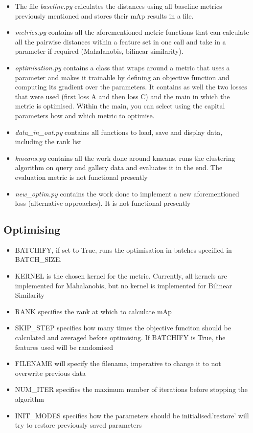 \documentclass[10pt,technote]{IEEEtran}
\begin{document}
\begin{itemize}
    \item The file \textit{baseline.py} calculates the distances using all baseline metrics previously mentioned and stores their mAp results in a file.
    \item \textit{metrics.py} contains all the aforementioned metric functions that can calculate all the pairwise distances within a feature set in one call and take in a parameter if required (Mahalanobis, bilinear similarity). 
    \item \textit{optimisation.py} contains a class that wraps around a metric that uses a parameter and makes it trainable by defining an objective function and computing its gradient over the parameters. It contains as well the two losses that were used (first loss A and then loss C) and the main in which the metric is optimised. Within the main, you can select using the capital parameters how and which metric to optimise.

    \item \textit{data\_in\_out.py} contains all functions to load, save and display data, including the rank list
    \item \textit{kmeans.py} contains all the work done around kmeans, runs the clustering algorithm on query and gallery data and evaluates it in the end. The evaluation metric is not functional presently
    \item \textit{new\_optim.py} contains the work done to implement a new aforementioned loss (alternative approaches). It is not functional presently
\end{itemize}
\subsection{Optimising}
\begin{itemize}
    \item BATCHIFY, if set to True, runs the optimisation in batches specified in BATCH\_SIZE.
    \item KERNEL is the chosen kernel for the metric. Currently, all kernels are implemented for Mahalanobis, but no kernel is implemented for Bilinear Similarity
    \item RANK specifies the rank at which to calculate mAp
    \item SKIP\_STEP specifies how many times the objective funciton should be calculated and averaged before optimising. If BATCHIFY is True, the features used will be randomised
    \item FILENAME will specify the filename, imperative to change it to not overwrite previous data
    \item NUM\_ITER specifies the maximum number of iterations before stopping the algorithm
    \item INIT\_MODES specifies how the parameters should be initialised.'restore' will try to restore previously saved parameters
\end{itemize}





\end{document}
